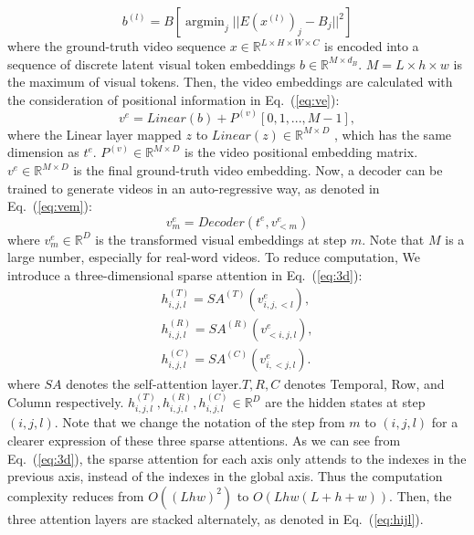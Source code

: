 \documentclass{article}
\begin{document}
\begin{equation} \label{eq:z} 
b^{(l)} = B\left[\mathop{\arg\min}_{j}||E(x^{(l)})_j-B_j||^2\right]
\end{equation}
where the ground-truth video sequence $x\in \mathbb{R}^{L\times H\times W\times C}$   is encoded into a sequence of discrete latent visual token embeddings  $b\in \mathbb{R}^{M\times d_B}$. $M=L\times h\times w$ is the maximum of visual tokens. Then, the video embeddings are calculated with the consideration of positional information in Eq.~(\ref{eq:ve}):
\begin{equation} \label{eq:ve} 
v^e=Linear(b) + P^{(v)}[0,1,...,M-1],
\end{equation}
where the Linear layer mapped $z$ to $Linear(z)\in \mathbb{R}^{M\times D}$ , which has the same dimension as $t^e$. $P^{(v)}\in \mathbb{R}^{M\times D}$ is the video positional embedding matrix. $v^e\in \mathbb{R}^{M\times D}$ is the final ground-truth video embedding.  Now, a decoder can be trained to generate videos in an auto-regressive way, as denoted in Eq.~(\ref{eq:vem}):
\begin{equation} \label{eq:vem} 
v^e_{m}=Decoder(t^e, v^e_{<m})
\end{equation}
where $v^e_m\in \mathbb{R}^D$ is the transformed visual embeddings at step $m$. Note that $M$ is a large number, especially for real-word videos. To reduce computation, We introduce a three-dimensional sparse attention in Eq.~(\ref{eq:3d}):
\begin{equation} \label{eq:3d} 
\begin{split}
h_{i,j,l}^{(T)}=SA^{(T)}(v^e_{i,j,<l}), \\
h_{i,j,l}^{(R)}=SA^{(R)}(v^e_{<i,j,l}), \\
h_{i,j,l}^{(C)}=SA^{(C)}(v^e_{i,<j,l}).
\end{split}
\end{equation}
where $SA$ denotes the self-attention layer.$T, R, C$ denotes Temporal, Row, and Column respectively. $h_{i,j,l}^{(T)},h_{i,j,l}^{(R)},h_{i,j,l}^{(C)}\in \mathbb{R}^D$ are the hidden states at step $(i, j, l)$. Note that we change the notation of the step from $m$ to $(i, j, l)$ for a clearer expression of these three sparse attentions. As we can see from Eq.~(\ref{eq:3d}), the sparse attention for each axis only attends to the indexes in the previous axis, instead of the indexes in the global axis.  Thus the computation complexity reduces from $O((Lhw)^2)$ to $O(Lhw(L+h+w))$. Then, the three attention layers are stacked alternately, as denoted in Eq.~(\ref{eq:hijl}).
\end{document}
